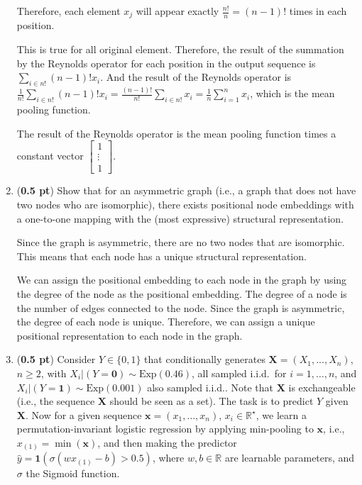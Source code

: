 \begin{enumerate}
Therefore, each element $x_j$ will appear exactly $\frac{n!}{n}=(n-1)!$ times in
each position.

This is true for all original element. Therefore, the result of the summation by
the Reynolds operator for each position in the output sequence is $\sum_{i \in
{n!}} (n-1)! x_i$. And the result of the Reynolds operator is $\frac{1}{n!}
\sum_{i \in {n!}} (n-1)! x_i = \frac{(n-1)!}{n!} \sum_{i \in {n!}} x_i =
\frac{1}{n} \sum_{i=1}^{n} x_i$, which is the mean pooling function.

The result of the Reynolds operator is the mean pooling function times a
constant vector $\begin{bmatrix} 1\\ \vdots\\ 1 \end{bmatrix}$.

\vfill

\vspace{2.5in}

\item ({\bf 0.5 pt}) Show that for an asymmetric graph (i.e., a graph that does
not have two nodes who are isomorphic), there exists positional node embeddings
with a one-to-one mapping with the (most expressive) structural representation.

Since the graph is asymmetric, there are no two nodes that are isomorphic. This
means that each node has a unique structural representation. 

We can assign the positional embedding to each node in the graph by using the
degree of the node as the positional embedding. The degree of a node is the
number of edges connected to the node. Since the graph is asymmetric, the degree
of each node is unique. Therefore, we can assign a unique positional representation
to each node in the graph.

\vspace{1in}
     
\item ({\bf 0.5 pt}) Consider $Y\in \{0,1\}$ that conditionally generates $\mathbf{X} = (X_1,...,X_n)$, $n \geq 2$, with $X_i|(Y=\textbf{0}) \sim \text{Exp}(0.46)$, all sampled i.i.d.\ for $i=1,\ldots,n$, and $X_i|(Y=\textbf{1}) \sim \text{Exp}(0.001)$ also sampled i.i.d.. 
Note that $\mathbf{X}$ is exchangeable (i.e., the sequence $\mathbf{X}$ should be seen as a set).
The task is to predict $Y$ given $\mathbf{X}$.
Now for a given sequence $\mathbf{x}=(x_1,\ldots,x_n)$, $x_i \in \mathbb{R}^\star$, we learn a permutation-invariant logistic regression by applying min-pooling to $\mathbf{x}$, i.e., $x_{(1)} = \min(\mathbf{x})$, and then making the predictor $\hat{y} = \mathbf{1}(\sigma(w x_{(1)}-b)>0.5)$, where $w,b\in\mathbb{R}$ are learnable parameters, and $\sigma$ the Sigmoid function.



\end{enumerate}
